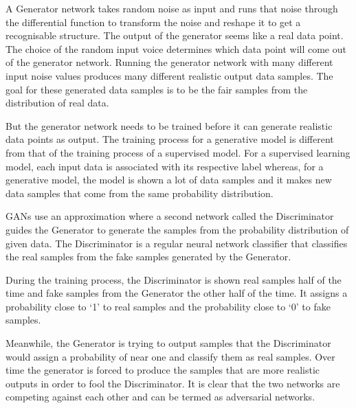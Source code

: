 A Generator network takes random noise as input and runs that noise through the differential function to transform the noise and reshape it to get a recognisable structure. The output of the generator seems like a real data point. The choice of the random input voice determines which data point will come out of the generator network. Running the generator network with many different input noise values produces many different realistic output data samples. The goal for these generated data samples is to be the fair samples from the distribution of real data.

But the generator network needs to be trained before it can generate realistic data points as output. The training process for a generative model is different from that of the training process of a supervised model. For a supervised learning model, each input data is associated with its respective label whereas, for a generative model, the model is shown a lot of data samples and it makes new data samples that come from the same probability distribution.

GANs use an approximation where a second network called the Discriminator guides the Generator to  generate the samples from the probability distribution of given data. The Discriminator is a regular neural network classifier that classifies the real samples from the fake samples generated by the Generator.

During the training process, the Discriminator is shown real samples half of the time and fake samples from the Generator the other half of the time. It assigns a probability close to ‘1’ to real samples and the probability close to ‘0’ to fake samples.

Meanwhile, the Generator is trying to output samples that the Discriminator would assign a probability of near one and classify them as real samples. Over time the generator is forced to produce the samples that are more realistic outputs in order to fool the Discriminator. It is clear that the two networks are competing against each other and can be termed as adversarial networks.  


